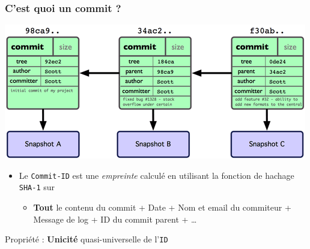 \documentclass[table,tikz,12pt,svgnames]{beamer}
\begin{document}
\begin{frame}
\frametitle{C'est quoi un commit ?}
	\vspace{-1em}
	\begin{block}{}
	\begin{adjustwidth}{-0.5cm}{}
		\begin{center}	
			{\includegraphics[scale=0.6]{images/git_commit.png}}
		\end{center}
	\end{adjustwidth}
	\end{block}

	\vspace{-2em}
	\begin{block}{}
	\begin{itemize}
		\item Le \texttt{Commit-ID} est une \textit{empreinte} calculé en utilisant la fonction de hachage \texttt{SHA-1} sur
		\begin{itemize}
			\item \textbf{Tout} le contenu du commit + Date + Nom et email du commiteur + Message de log + ID du commit parent + \ldots
		\end{itemize}
	\end{itemize}
	Propriété : \textbf{Unicité} quasi-universelle de l'\texttt{ID}
\end{block}
\end{frame}
\end{document}
